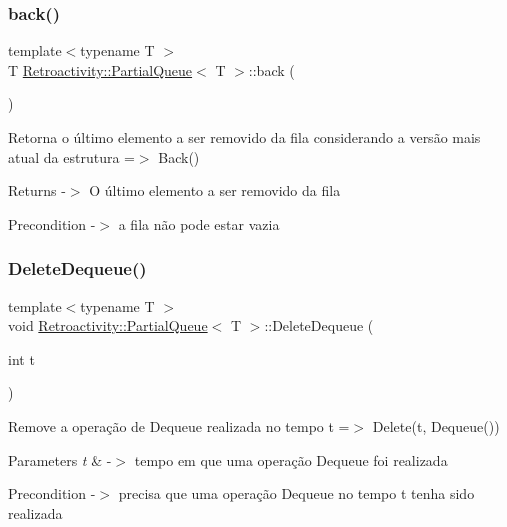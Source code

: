 \subsubsection{\texorpdfstring{back()}{back()}}
{\footnotesize\ttfamily template$<$typename T $>$ \\
T \hyperlink{classRetroactivity_1_1PartialQueue}{Retroactivity\+::\+Partial\+Queue}$<$ T $>$\+::back (\begin{DoxyParamCaption}{ }\end{DoxyParamCaption})}

Retorna o último elemento a ser removido da fila considerando a versão mais atual da estrutura =$>$ Back()

\begin{DoxyReturn}{Returns}
-\/$>$ O último elemento a ser removido da fila 
\end{DoxyReturn}
\begin{DoxyPrecond}{Precondition}
-\/$>$ a fila não pode estar vazia 
\end{DoxyPrecond}
\mbox{\label{classRetroactivity_1_1PartialQueue_ae44ce14220e3c46a37d151d880f01167}} 
\subsubsection{\texorpdfstring{Delete\+Dequeue()}{DeleteDequeue()}}
{\footnotesize\ttfamily template$<$typename T $>$ \\
void \hyperlink{classRetroactivity_1_1PartialQueue}{Retroactivity\+::\+Partial\+Queue}$<$ T $>$\+::Delete\+Dequeue (\begin{DoxyParamCaption}\item[{int}]{t }\end{DoxyParamCaption})}

Remove a operação de Dequeue realizada no tempo t =$>$ Delete(t, Dequeue())


\begin{DoxyParams}{Parameters}
{\em t} & -\/$>$ tempo em que uma operação Dequeue foi realizada \\
\hline
\end{DoxyParams}
\begin{DoxyPrecond}{Precondition}
-\/$>$ precisa que uma operação Dequeue no tempo t tenha sido realizada 
\end{DoxyPrecond}
\mbox{\label{classRetroactivity_1_1PartialQueue_a467666a5abfb3c739addfe128583eb4b}} 
